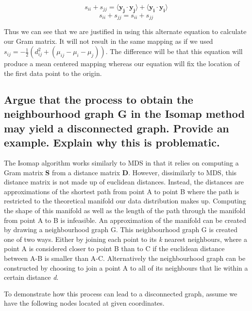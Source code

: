 \documentclass[11pt,a4paper,landscape]{article}
\begin{document}
$$ s_{ii} + s_{jj} = \langle \mathbf{y_{j}} \cdot \mathbf{y_{j}} \rangle + \langle \mathbf{y_{i}} \cdot \mathbf{y_{i}} \rangle$$
$$ s_{ii} + s_{jj} = s_{ii} + s_{jj} $$

Thus we can see that we are justified in using this alternate equation to calculate our Gram matrix. It will not result in the same mapping as if we used $ s_{ij} = -\frac{1}{2}(d^{2}_{ij} +( \mu_{ij} - \mu_{i} - \mu_{j}))$. The difference will be that this equation will produce a mean centered mapping whereas our equation will fix the location of the first data point to the origin.


\subsection{Argue that the process to obtain the neighbourhood graph G in the Isomap method may yield a disconnected graph.  Provide an example.  Explain why this is problematic.}

The Isomap algorithm works similarly to MDS in that it relies on computing a Gram matrix \textbf{S} from a distance matrix \textbf{D}. However, dissimilarly to MDS, this distance matrix is not made up of euclidean distances. Instead, the distances are approximations of the shortest path from point A to point B where the path is restricted to the theoretical manifold our data distribution makes up. Computing the shape of this manifold as well as the length of the path through the manifold from point A to B is infeasible. An approximation of the manifold can be created by drawing a neighbourhood graph G. This neighbourhood graph G is created one of two ways. Either by joining each point to its \textit{k} nearest neighbours, where a point A is considered closer to point B than to C if the euclidean distance between A-B is smaller than A-C.  Alternatively the neighbourhood graph can be constructed by choosing to join a point A to all of its neighbours that lie within a certain distance \textit{d}.\newline


To demonstrate how this process can lead to a disconnected graph,  assume we have the following nodes located at given coordinates.

\end{document}
